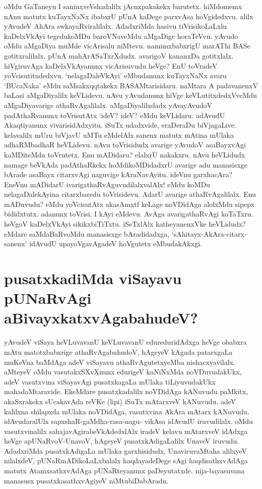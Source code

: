 oMdu GaTaneyu I saninxveVshadalilx jAcnxpakakekx barutetx. hiMdomemx nAnu matutx kuTayxNaNx ibabxrU pUnA kaDege parxvAsa hoVgidedxvu. alilx yAvudeV AhAra swkayaRviralilalx. AdadxriMda hasivu tiVrisikoLaLxlu kaDelxVkAyi tegedukoMDu baroVNaveMdu aMgaDige horaTeVvu. yAvudo oMdu aMgaDiya muMde vicArisalu niMtevu. namimxbabxrigU marAThi BASe gotitxralilalx. pUnA mahArASaTxrXdudx. avarigoV kananxDa gotitxlalx. hiVgiruvAga kaDelxVkAyanunx vicArisuvudu heVge? EnU toVradeV yoVcisutitxdedxvu. `nelagaDaleVkAyi' eMbudanunx kuTayxNaNx avaru `BUcaNaka' eMdu saMsakxqqtakekx  BASAMtarisidaru. naMtara A padavanenxV baLasi aMgaDiyalilx keVLidevu. nAvu yAvudanunx hiVge keVLutitxdedxVveMdu aMgaDiyavarige athaRvAgalilalx. aMgaDiyalilxdadx yAvayAvudoV padAthaRvanunx toVrisutAtx `ideV? ideV? eMdu keVLidaru. adAvudU Akaqtiyanunx vivarisidAdxyitu. iSuTx udadxvide, eraDeraDu biVjagaLive. kelavalilx mUru biVjavU uMTu eMdelAlx sanenx matutx mAtina mUlaka adhaRMbadhaR heVLidevu. nAvu toVrisidudx avarige yAvudoV asaBayxvAgi kaMDiteMdu toVrutetx. Enu mADidaru? elalxrU nakakxru. nAvu heVLidudx namage beVkAda padAthaRkekx hoMdikoMDidadxrU avarige adu manasisxge bArade asaBayx citarxvAgi naguvige kAraNavAyitu. ideVnu garxhacAra? EneVnu mADidarU ivarigathaRvAguvudilalxvalAlx! eMdu koMDu nelagaDalekAyina citarxbaredu toVrisidevu. AdarU avarige athaRvAgalilalx. Enu mADuvudu? eMdu yoVcisutAtx akasAmxtf keLage noVDidAga alolxMdu sipepx bididxtutx. adanunx toVrisi, I kAyi eMdevu. AvAga avarigathaRvAgi koTaTxru. heVgoV kaDelxVkAyi sikikxbiTiTxtu. iSeTxlAlx katheyanenxVke heVLidudx? eMdare saMdaBaRvoMdu manasisxge bAradidadxga, `sAhitayx-AkAra-citarx-sanenx' idAvudU upayoVgavAgadeV hoVgutetx eMbudakAkxgi.

\section*{pusatxkadiMda viSayavu pUNaRvAgi aBivayxkatxvAgabahudeV?}

yAvudeV viSaya heVLuvavanU keVLuvavanU edureduridAdxga heVge obabxra mAtu matotxbabxrige athaRvAgabahudoV, hAgeyeV kAgada patarxgaLa muKeVna baMdAga adeV viSayavu athaRvAgutetxyeMba nishacxyavilalx. aMteyeV oMdu vasutakxSXvXnunx edurigeV kaNiNxMda noVDuvudakUkx, adeV vasutxvina viSayavAgi pusatxkagaLa mUlaka tiLiyuvudakUkx mahadaMtaravide. EkeMdare
pusatxkadalilx noVDidAga kANuvudu paMkitx, akaSxrakekx sUcakavAda reVKe (lipi) iSuTx mAtarxveV kANuvudu. adeV kalilxna shilapxda mUlaka  noVDidAga, vasutxvina AkAra mAtarx kANuvudu. idAvudaralUlx sapxshaR-gaMdha-rasa-nagu- vikAsa idAvudU iruvudilalx. oMdu vasutxvinalilx sahajavAgirabeVkAdedxlAlx iradeV kelavu mAtarxveV idAdxga heVge apUNaRvoV-UnavoV, hAgeyeV pusatxkAdigaLalilx UnaveV iruvudu. AdadxriMda pusatxkAdigaLa mUlaka garxhisidudx, UnaviruvaMtaha alilxyeV nilalxdeV, pUNaRmADikoLaLxbalalx haqdayadeDege sAgi haqdisathxvAdAga matutx AtamxsathxvAdAga pUNaRteyanunx paDeyutatxde. nija-bayasuvana manasusx pusatxkasathxvAgiyeV niMtubiDabAradu.

